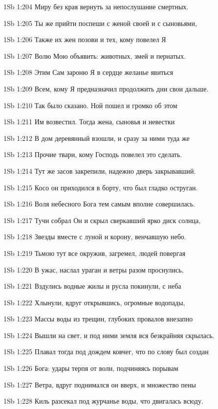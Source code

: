 \vs 1Sb 1:204 Миру без края вернуть за непослушание смертных.

\vs 1Sb 1:205 Ты же прийти поспеши с женой своей и с сыновьями,

\vs 1Sb 1:206 Также их жен позови и тех, кому повелел Я

\vs 1Sb 1:207 Волю Мою объявить: животных, змей и пернатых.

\vs 1Sb 1:208 Этим Сам зароню Я в сердце желанье явиться 

\vs 1Sb 1:209 Всем, кому Я предназначил продолжить дни свои дальше.

\vs 1Sb 1:210 Так было сказано. Ной пошел и громко об этом

\vs 1Sb 1:211 Им возвестил. Тогда жена, сыновья и невестки

\vs 1Sb 1:212 В дом деревянный взошли, и сразу за ними туда же

\vs 1Sb 1:213 Прочие твари, кому Господь повелел это сделать.

\vs 1Sb 1:214 Тут же засов закрепили, надежно дверь закрывавший.

\vs 1Sb 1:215 Косо он приходился в борту, что был гладко оструган.

\vs 1Sb 1:216 Воля небесного Бога тем самым вполне совершилась.

\vs 1Sb 1:217 Тучи собрал Он и скрыл сверкавший ярко диск солнца,

\vs 1Sb 1:218 Звезды вместе с луной и корону, венчавшую небо.

\vs 1Sb 1:219 Тьмою тут все окружив, загремел, людей повергая

\vs 1Sb 1:220 В ужас, наслал ураган  и ветры разом проснулись,

\vs 1Sb 1:221 Вздулись водные жилы и русла покинули, с неба

\vs 1Sb 1:222 Хлынули, вдруг открывшись, огромные водопады,

\vs 1Sb 1:223 Массы воды из трещин, глубоких провалов внезапно

\vs 1Sb 1:224 Вышли на свет, и под ними земля вся безкрайняя скрылась.

\vs 1Sb 1:225 Плавал тогда под дождем ковчег, что по слову был создан

\vs 1Sb 1:226 Бога: удары терпя от волн, подчиняясь порывам

\vs 1Sb 1:227 Ветра, вдруг поднимался он вверх, и множество пены

\vs 1Sb 1:228 Киль разсекал под журчанье воды, что двигалась всюду.

